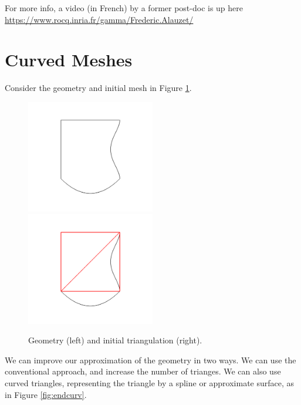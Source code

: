 \documentclass[12pt]{article}
\begin{document}
For more info, a video (in French) by a former post-doc is up here \url{https://www.rocq.inria.fr/gamma/Frederic.Alauzet/}

\section{Curved Meshes}
Consider the geometry and initial mesh in Figure \ref{fig:initcurv}.
\begin{figure}
\includegraphics[width=0.5\textwidth]{images/curvedgeom.png}
\includegraphics[width=0.5\textwidth]{images/curved1.png}
\caption{Geometry (left) and initial triangulation (right).}
\label{fig:initcurv}
\end{figure}
We can improve our approximation of the geometry in two ways. We can use the conventional approach, and increase the number of trianges. We can also use curved triangles, representing the triangle by a spline or approximate surface, as in Figure \ref{fig:endcurv}.
\end{document}
